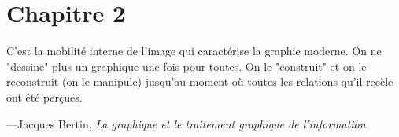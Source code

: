 
\chapter{Chapitre 2}
\label{ch-2}

\epigraph{C'est la mobilité interne de l'image qui caractérise la graphie moderne. On ne "dessine" plus un graphique une fois pour toutes. On le "construit" et on le reconstruit (on le manipule) jusqu'au moment où toutes les relations qu'il recèle ont été perçues.}{---Jacques Bertin, \textit{La graphique et le traitement graphique de l'information}}

\lipsum[2-4]


